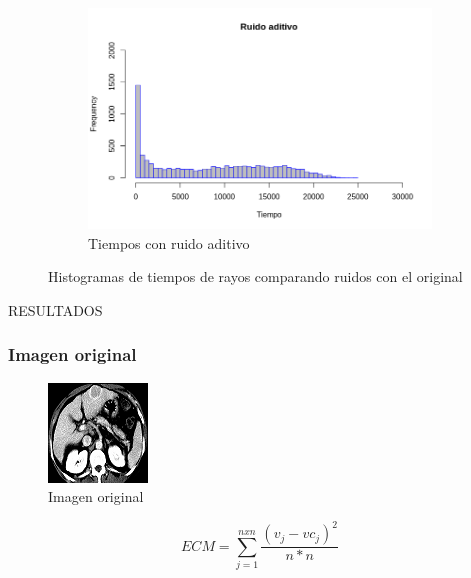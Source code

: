 \documentclass[11pt]{beamer}
\begin{document}
\begin{frame}
\begin{figure}[H]
\begin{subfigure}[h]{0.45\textwidth}
            \includegraphics[width=\textwidth]{img/ruidoAditivo.png}
            \caption{Tiempos con ruido aditivo}
            \label{fig:Tiempos con ruido aditivo}
        \end{subfigure}
        
        \caption{Histogramas de tiempos de rayos comparando ruidos con el original}
    \end{figure}
\end{frame}





\begin{frame}{RESULTADOS}
    \frametitle{Imagen original}
    \begin{figure}
    \centering
            \includegraphics[scale=1]{img/tomo.png}
            \caption{Imagen original}
            \label{fig:original}
    \end{figure}
$$
ECM = \sum_{j=1}^{nxn}\dfrac{(v_j-vc_{j})^2}{n*n}
$$
\end{frame}
\end{document}
